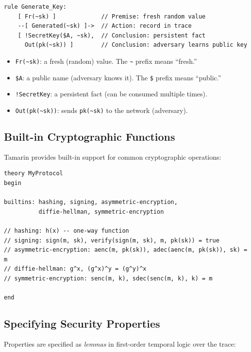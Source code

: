 \documentclass[11pt,a4paper]{article}
\begin{document}
\begin{lstlisting}[language=Tamarin,caption={A multiset rewriting rule}]
rule Generate_Key:
    [ Fr(~sk) ]             // Premise: fresh random value
    --[ Generated(~sk) ]->  // Action: record in trace
    [ !SecretKey($A, ~sk),  // Conclusion: persistent fact
      Out(pk(~sk)) ]        // Conclusion: adversary learns public key
\end{lstlisting}

\begin{itemize}[nosep]
  \item \texttt{Fr(\~{}sk)}: a fresh (random) value. The \texttt{\~{}} prefix means ``fresh.''
  \item \texttt{\$A}: a public name (adversary knows it). The \texttt{\$} prefix means ``public.''
  \item \texttt{!SecretKey}: a persistent fact (can be consumed multiple times).
  \item \texttt{Out(pk(\~{}sk))}: sends \texttt{pk(\~{}sk)} to the network (adversary).
\end{itemize}

\subsection{Built-in Cryptographic Functions}

Tamarin provides built-in support for common cryptographic operations:

\begin{lstlisting}[language=Tamarin,caption={Tamarin builtins}]
theory MyProtocol
begin

builtins: hashing, signing, asymmetric-encryption,
          diffie-hellman, symmetric-encryption

// hashing: h(x) -- one-way function
// signing: sign(m, sk), verify(sign(m, sk), m, pk(sk)) = true
// asymmetric-encryption: aenc(m, pk(sk)), adec(aenc(m, pk(sk)), sk) = m
// diffie-hellman: g^x, (g^x)^y = (g^y)^x
// symmetric-encryption: senc(m, k), sdec(senc(m, k), k) = m

end
\end{lstlisting}

\subsection{Specifying Security Properties}

Properties are specified as \emph{lemmas} in first-order temporal logic over the trace:
\end{document}
